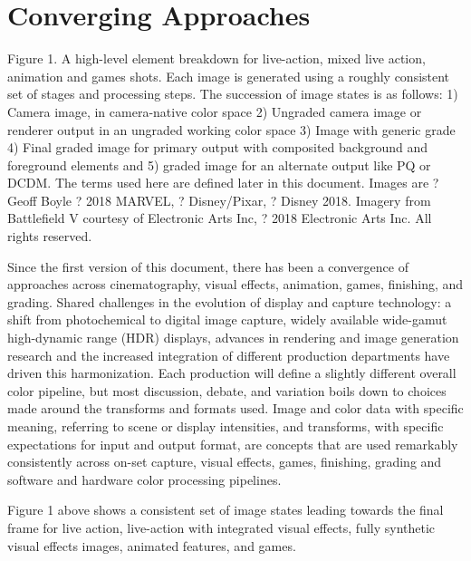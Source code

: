 \section{Converging Approaches}%
\label{sec:converging-approaches}

Figure 1. A high-level element breakdown for live-action, mixed live action, animation and games shots. Each image is generated using a roughly consistent set of stages and processing steps. The succession of image states is as follows: 1) Camera image, in camera-native color space 2) Ungraded camera image or renderer output in an ungraded working color space 3) Image with generic grade 4) Final graded image for primary output with composited background and foreground elements and 5) graded image for an alternate output like PQ or DCDM. The terms used here are defined later in this document.
Images are ? Geoff Boyle  ? 2018 MARVEL, ? Disney/Pixar,  ? Disney 2018. Imagery from Battlefield V courtesy of Electronic Arts Inc, ? 2018 Electronic Arts Inc. All rights reserved.

Since the first version of this document, there has been a convergence of approaches across cinematography, visual effects, animation, games, finishing, and grading. Shared challenges in the evolution of display and capture technology: a shift from photochemical to digital image capture, widely available wide-gamut high-dynamic range (HDR) displays, advances in rendering and image generation research and the increased integration of different production departments have driven this harmonization. Each production will define a slightly different overall color pipeline, but most discussion, debate, and variation boils down to choices made around the transforms and formats used. Image and color data with specific meaning, referring to scene or display intensities, and transforms, with specific expectations for input and output format, are concepts that are used remarkably consistently across on-set capture, visual effects, games, finishing, grading and software and hardware color processing pipelines.

Figure 1 above shows a consistent set of image states leading towards the final frame for live action, live-action with integrated visual effects, fully synthetic visual effects images, animated features, and games.

